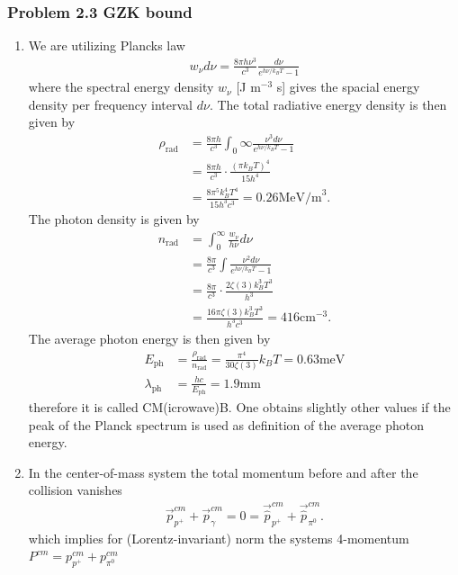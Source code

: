 \documentclass[10pt,a4paper]{book}
\theoremstyle{definition}
\begin{document}
\subsubsection{Problem 2.3 GZK bound}
\begin{enumerate}
    \item We are utilizing Plancks law
    \begin{align}
        w_\nu d\nu = \frac{8\pi h\nu^3}{c^3}\frac{d\nu}{e^{h\nu/k_BT}-1}
    \end{align}
    where the spectral energy density $w_\nu$ [J m$^{-3}$ s] gives the spacial energy density per frequency interval $d\nu$. The total radiative energy density is then given by
    \begin{align}
        \rho_\text{rad} &= \frac{8\pi h}{c^3}\int_0\infty \frac{\nu^3d\nu}{e^{h\nu/k_BT}-1}\\
        &=\frac{8\pi h}{c^3}\cdot\frac{(\pi k_B T)^4}{15h^4}\\
        &=\frac{8\pi^5k_B^4 T^4}{15h^3 c^3}=0.26\text{MeV/m}^3.
    \end{align}
    The photon density is given by
    \begin{align}
        n_\text{rad} &=\int_0^\infty\frac{w_\nu}{h\nu}d\nu\\
        &= \frac{8\pi}{c^3}\int \frac{\nu^2d\nu}{e^{h\nu/k_BT}-1}\\
        &=\frac{8\pi}{c^3}\cdot\frac{2\zeta(3) k_B^3 T^3}{h^3}\\
        &=\frac{16\pi\zeta(3) k_B^3 T^3}{h^3c^3}=416\text{cm}^{-3}.
    \end{align}
    The average photon energy is then given by
    \begin{align}
        E_\text{ph}&=\frac{\rho_\text{rad}}{n_\text{rad}}=\frac{\pi^4}{30\zeta(3)}k_BT=0.63\text{meV}\\
        \lambda_\text{ph}&=\frac{hc}{E_\text{ph}}=1.9\text{mm}
    \end{align}
    therefore it is called CM(icrowave)B.
    One obtains slightly other values if the peak of the Planck spectrum is used as definition of the average photon energy.
    \item In the center-of-mass system the total momentum before and after the collision vanishes
    \begin{align}
        \vec{p}_{p^+}^{cm}+\vec{p}_\gamma^{cm}=0=\vec{\hat{p}}_{p^+}^{cm}+\vec{\hat{p}}_{\pi^0}^{cm}.
    \end{align}
    which implies for (Lorentz-invariant) norm the systems 4-momentum $P^{cm}=p_{p^+}^{cm}+p_{\pi^0}^{cm}$

\end{enumerate}
\end{document}
